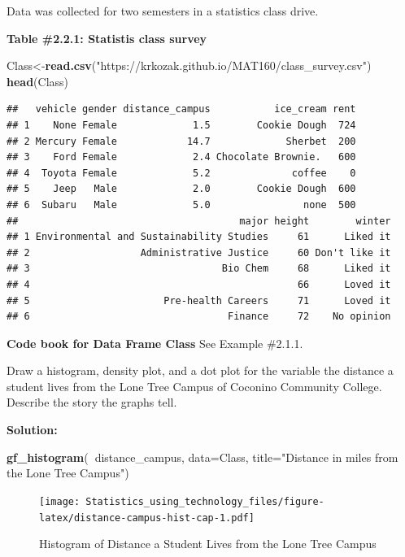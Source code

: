 \documentclass[]{book}
\newenvironment{Shaded}{\begin{snugshade}}{\end{snugshade}}
\newcommand{\DataTypeTok}[1]{\textcolor[rgb]{0.13,0.29,0.53}{#1}}
\newcommand{\KeywordTok}[1]{\textcolor[rgb]{0.13,0.29,0.53}{\textbf{#1}}}
\newcommand{\NormalTok}[1]{#1}
\newcommand{\OperatorTok}[1]{\textcolor[rgb]{0.81,0.36,0.00}{\textbf{#1}}}
\newcommand{\StringTok}[1]{\textcolor[rgb]{0.31,0.60,0.02}{#1}}
\begin{document}
Data was collected for two semesters in a statistics class drive.

\textbf{Table \#2.2.1: Statistis class survey}

\begin{Shaded}
\begin{Highlighting}[]
\NormalTok{Class<-}\KeywordTok{read.csv}\NormalTok{(}\StringTok{"https://krkozak.github.io/MAT160/class_survey.csv"}\NormalTok{)}
\KeywordTok{head}\NormalTok{(Class)}
\end{Highlighting}
\end{Shaded}

\begin{verbatim}
##   vehicle gender distance_campus           ice_cream rent
## 1    None Female             1.5        Cookie Dough  724
## 2 Mercury Female            14.7             Sherbet  200
## 3    Ford Female             2.4 Chocolate Brownie.   600
## 4  Toyota Female             5.2              coffee    0
## 5    Jeep   Male             2.0        Cookie Dough  600
## 6  Subaru   Male             5.0                none  500
##                                      major height        winter
## 1 Environmental and Sustainability Studies     61      Liked it
## 2                   Administrative Justice     60 Don't like it
## 3                                 Bio Chem     68      Liked it
## 4                                              66      Loved it
## 5                       Pre-health Careers     71      Loved it
## 6                                  Finance     72    No opinion
\end{verbatim}

\textbf{Code book for Data Frame Class} See Example \#2.1.1.

Draw a histogram, density plot, and a dot plot for the variable the distance a student lives from the Lone Tree Campus of Coconino Community College. Describe the story the graphs tell.

\textbf{Solution:}



\begin{Shaded}
\begin{Highlighting}[]
\KeywordTok{gf_histogram}\NormalTok{(}\OperatorTok{~}\NormalTok{distance_campus, }\DataTypeTok{data=}\NormalTok{Class, }\DataTypeTok{title=}\StringTok{"Distance in miles from the Lone Tree Campus"}\NormalTok{)}
\end{Highlighting}
\end{Shaded}

\begin{figure}
\centering
\texttt{[image: Statistics\_using\_technology\_files/figure-latex/distance-campus-hist-cap-1.pdf]}
\caption{\label{fig:distance-campus-hist-cap}Histogram of Distance a Student Lives from the Lone Tree Campus}
\end{figure}
\end{document}
